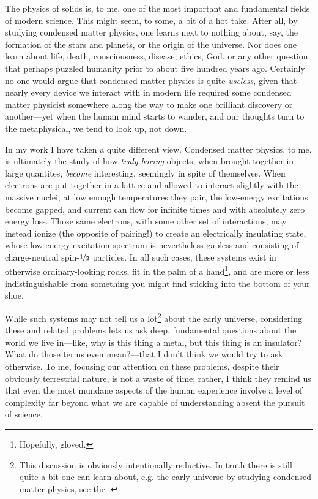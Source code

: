 The physics of solids is, to me, one of the most important and fundamental fields of modern science.
This might seem, to some, a bit of a hot take.
After all, by studying condensed matter physics, one learns next to nothing about, say, the formation of the stars and planets, or the origin of the universe.
Nor does one learn about life, death, consciousness, disease, ethics, God, or any other question that perhaps puzzled humanity prior to about five hundred years ago.
Certainly no one would argue that condensed matter physics is quite \emph{useless}, given that nearly every device we interact with in modern life required some condensed matter physicist somewhere along the way to make one brilliant discovery or another---yet when the human mind starts to wander, and our thoughts turn to the metaphysical, we tend to look up, not down.

In my work I have taken a quite different view.
Condensed matter physics, to me, is ultimately the study of how \textit{truly boring} objects, when brought together in large quantites, \textit{become} interesting, seemingly in spite of themselves.
When electrons are put together in a lattice and allowed to interact slightly with the massive nuclei, at low enough temperatures they pair, the low-energy excitations become gapped, and current can flow for infinite times and with absolutely zero energy loss.
Those same electrons, with some other set of interactions, may instead ionize (the opposite of pairing!) to create an electrically insulating state, whose low-energy excitation spectrum is nevertheless gapless and consisting of charge-neutral spin-$\nicefrac{1}{2}$ particles.
In all such cases, these systems exist in otherwise ordinary-looking rocks, fit in the palm of a hand\footnote{Hopefully, gloved.}, and are more or less indistinguishable from something you might find sticking into the bottom of your shoe.

While such systems may not tell us a lot\footnote{
    This discussion is obviously intentionally reductive.
    In truth there is still quite a bit one can learn about, e.g. the early universe by studying condensed matter physics, see the \citet{kibble_introduction_2008}.
}
about the early universe, considering these and related problems lets us ask deep, fundamental questions about the world we live in---like, why is this thing a metal, but this thing is an insulator? What do those terms even mean?---that I don't think we would try to ask otherwise.
To me, focusing our attention on these problems, despite their obviously terrestrial nature, is not a waste of time; rather, I think they remind us that even the most mundane aspects of the human experience involve a level of complexity far beyond what we are capable of understanding absent the pursuit of science.

